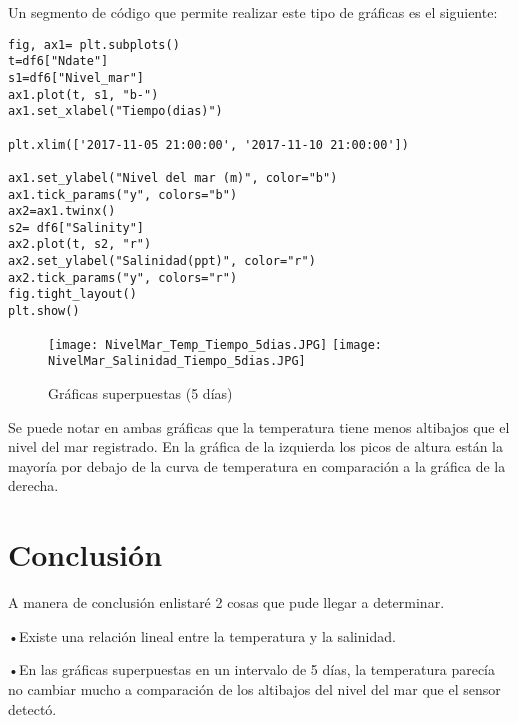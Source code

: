 \documentclass[a4paper]{article}
\begin{document}
Un segmento de código que permite realizar este tipo de gráficas es el siguiente:

\begin{verbatim}
fig, ax1= plt.subplots()
t=df6["Ndate"]
s1=df6["Nivel_mar"]
ax1.plot(t, s1, "b-")
ax1.set_xlabel("Tiempo(dias)")

plt.xlim(['2017-11-05 21:00:00', '2017-11-10 21:00:00'])

ax1.set_ylabel("Nivel del mar (m)", color="b")
ax1.tick_params("y", colors="b")
ax2=ax1.twinx()
s2= df6["Salinity"]
ax2.plot(t, s2, "r")
ax2.set_ylabel("Salinidad(ppt)", color="r")
ax2.tick_params("y", colors="r")
fig.tight_layout()
plt.show()
\end{verbatim}

\begin{figure}[h!]
\centering 
\texttt{[image: NivelMar\_Temp\_Tiempo\_5dias.JPG]}
\label{fig:00Z}
\texttt{[image: NivelMar\_Salinidad\_Tiempo\_5dias.JPG]}
\label{fig:12Z}  
\caption{Gráficas superpuestas (5 días)}
\end{figure}

Se puede notar en ambas gráficas que la temperatura tiene menos altibajos que el nivel del mar registrado. En la gráfica de la izquierda los picos de altura están la mayoría por debajo de la curva de temperatura en comparación a la gráfica de la derecha.

\section{Conclusión}
A manera de conclusión enlistaré 2 cosas que pude llegar a determinar.

•Existe una relación lineal entre la temperatura y la salinidad.

•En las gráficas superpuestas en un intervalo de 5 días, la temperatura parecía no cambiar mucho a comparación de los altibajos del nivel del mar que el sensor detectó.
\end{document}
